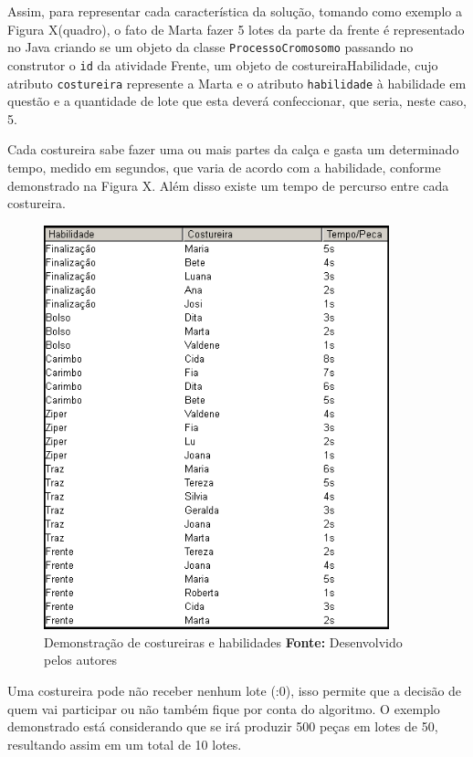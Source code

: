  \par Assim, para representar cada característica da solução, tomando como exemplo a Figura X(quadro), 
o fato de Marta fazer 5 lotes da parte da frente é representado no Java criando se um objeto da classe \texttt{ProcessoCromosomo}
passando no construtor o \texttt{id} da atividade Frente, um objeto de costureiraHabilidade, cujo atributo \texttt{costureira} represente
a Marta e o atributo \texttt{habilidade} à habilidade em questão e a quantidade de lote que esta deverá confeccionar, que seria, neste caso, 5.
 
\par 






\par Cada costureira sabe fazer uma ou mais partes da calça e gasta um determinado tempo, medido em segundos, que
varia de acordo com a habilidade, conforme demonstrado na Figura X. Além disso existe um tempo de percurso entre 
cada costureira. 

\begin{figure}[h!]
	\centerline{\includegraphics[width=10cm]{./imagens/tempo_habilidade2.png}}
	\caption[Costureiras e Habilidades]
	{Demonstração de costureiras e habilidades \textbf{Fonte:} Desenvolvido pelos autores}
	\label{fig:exemplo1}
\end{figure}


Uma costureira pode não receber nenhum lote (:0), isso permite que a decisão de quem vai participar ou não também 
fique por conta do algoritmo. O exemplo demonstrado está considerando que se irá produzir 500 peças em lotes de 50, 
resultando assim em um total de 10 lotes.

